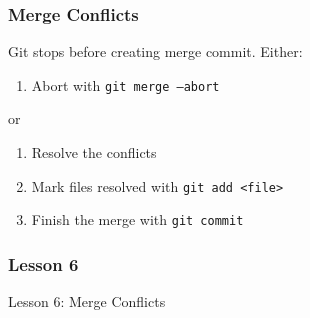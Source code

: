 \begin{frame}
    \frametitle{Merge Conflicts}
    Git stops before creating merge commit. Either:
    \medskip
    \begin{enumerate}[1.]
        \item Abort with \texttt{git merge --abort}
    \end{enumerate}
    \medskip
    or
    \medskip
    \begin{enumerate}[1.]
        \item Resolve the conflicts
        \item Mark files resolved with \texttt{git add <file>}
        \item Finish the merge with \texttt{git commit}
    \end{enumerate}
\end{frame}

\begin{frame}
    \frametitle{Lesson 6}
    \alert{Lesson 6}: Merge Conflicts
\end{frame}
